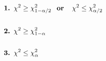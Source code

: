 \documentclass[12pt]{article}
\begin{document}
\pagestyle{empty}
\Large
{}
\pagecolor{ehandbook}

\boldmath

\hspace*{.25in}

\begin{eqnarray*}
\mbox{\bf 1.  } & \chi^2 \ge \chi^2_{1-\alpha/2} \mbox{\bf \,\, or \,\, } \chi^2 \le \chi^2_{\alpha/2} \\
 & \\
\mbox{\bf 2.  } & \chi^2  \ge \chi^2_{1-\alpha}  \\
 & \\
\mbox{\bf 3.  } & \chi^2  \le \chi^2_{\alpha}  \\
\end{eqnarray*}
\end{document}
